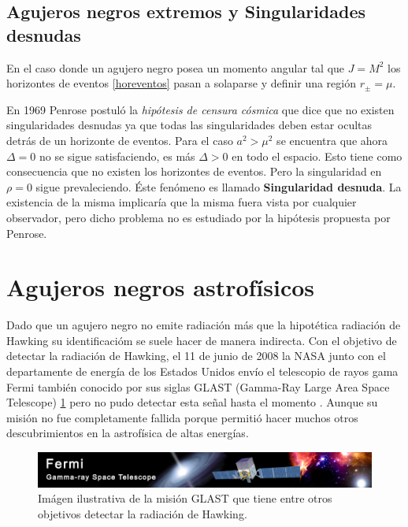 \documentclass[12pt]{article}
\theoremstyle{plain}
\begin{document}
\subsection{Agujeros negros extremos y Singularidades desnudas}\label{ebh}
En el caso donde un agujero negro posea un momento angular tal que $J=M^2$ los horizontes de eventos \ref{horeventos} pasan a solaparse y definir una región $r_{\pm}=\mu$.

En 1969 Penrose postuló \cite{cosmiccensor} la \textit{hipótesis de censura cósmica} que dice que no existen singularidades desnudas ya que todas las singularidades deben estar ocultas detrás de un horizonte de eventos.
Para el caso $a^2>\mu ^2$ se encuentra que ahora $\Delta =0$ no se sigue satisfaciendo, es más $\Delta >0$ en todo el espacio. Esto tiene como consecuencia que no existen los horizontes de eventos. Pero la singularidad en $\rho =0$ sigue prevaleciendo. Éste fenómeno es llamado \textbf{Singularidad desnuda}. La existencia de la misma implicaría que la misma fuera vista por cualquier observador, pero dicho problema no es estudiado por la hipótesis propuesta por Penrose.


 \section{Agujeros negros astrofísicos}
Dado que un agujero negro no emite radiación más que la hipotética radiación de Hawking su identificacióm se suele hacer de manera indirecta. Con el objetivo de detectar la radiación de Hawking, el 11 de junio de 2008 la NASA junto con el departamente de energía de los Estados Unidos envío el telescopio de rayos gama Fermi también conocido por sus siglas GLAST (Gamma-Ray Large Area Space Telescope) \ref{fermi_foto} pero no pudo detectar esta señal hasta el momento \cite{fermi}. Aunque su misión no fue completamente fallida porque permitió hacer muchos otros descubrimientos en la astrofísica de altas energías.

\begin{figure}[H]
\centering
\includegraphics[width=\textwidth]{fermi_banner.jpg}
\caption{Imágen ilustrativa de la misión GLAST que tiene entre otros objetivos detectar la radiación de Hawking.}
\label{fermi_foto}
\end{figure}
\end{document}

